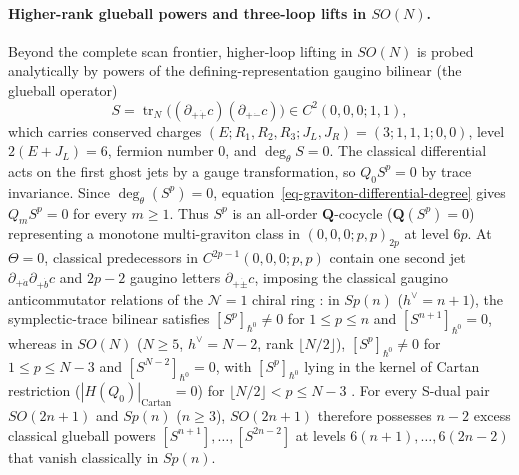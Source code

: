 \documentclass[11pt]{article}
\numberwithin{equation}{section}
\numberwithin{figure}{section}
\numberwithin{table}{section}
\newcommand{\HQC}{|H(Q_0)|_{\mathrm{Cartan}}}
\begin{document}
\paragraph{Higher-rank glueball powers and three-loop lifts in $SO(N)$.}
Beyond the complete scan frontier, higher-loop lifting in $SO(N)$ is probed analytically by powers of the defining-representation gaugino bilinear (the glueball operator)
\begin{equation}\label{eq-orthogonal-glueball-def}
S=\operatorname{tr}_N\bigl((\partial_{+\dot+}c)(\partial_{+\dot-}c)\bigr)\in C^2(0,0,0;1,1),
\end{equation}
which carries conserved charges $(E;R_1,R_2,R_3;J_L,J_R)=(3;1,1,1;0,0)$, level $2(E+J_L)=6$, fermion number $0$, and $\deg_\theta S=0$. The classical differential acts on the first ghost jets by a gauge transformation, so $Q_0S^p=0$ by trace invariance. Since $\deg_\theta(S^p)=0$, equation~\eqref{eq-graviton-differential-degree} gives $Q_m S^p=0$ for every $m\ge1$. Thus $S^p$ is an all-order $\mathbf Q$-cocycle ($\mathbf Q(S^p)=0$) representing a monotone multi-graviton class in $(0,0,0;p,p)_{2p}$ at level $6p$. At $\Theta=0$, classical predecessors in $C^{2p-1}(0,0,0;p,p)$ contain one second jet $\partial_{+\dot a}\partial_{+\dot b}c$ and $2p-2$ gaugino letters $\partial_{+\dot\pm}c$, imposing the classical gaugino anticommutator relations of the $\mathcal N=1$ chiral ring \cite{CDSW,WittenSpSO,EtingofII}: in $Sp(n)$ ($h^\vee=n+1$), the symplectic-trace bilinear satisfies $[S^p]_{\hbar^0}\ne0$ for $1\le p\le n$ and $[S^{n+1}]_{\hbar^0}=0$, whereas in $SO(N)$ ($N\ge5$, $h^\vee=N-2$, rank $\lfloor N/2\rfloor$), $[S^p]_{\hbar^0}\ne0$ for $1\le p\le N-3$ and $[S^{N-2}]_{\hbar^0}=0$, with $[S^p]_{\hbar^0}$ lying in the kernel of Cartan restriction ($\HQC=0$) for $\lfloor N/2\rfloor<p\le N-3$ \cite{KvLM}. For every S-dual pair $SO(2n+1)$ and $Sp(n)$ ($n\ge3$), $SO(2n+1)$ therefore possesses $n-2$ excess classical glueball powers $[S^{n+1}],\ldots,[S^{2n-2}]$ at levels $6(n+1),\ldots,6(2n-2)$ that vanish classically in $Sp(n)$.
\end{document}
